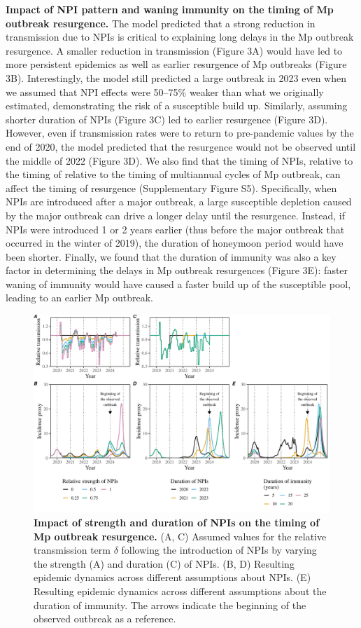 \documentclass[12pt]{article}
\begin{document}
\textbf{Impact of NPI pattern and waning immunity on the timing of Mp outbreak resurgence.}
The model predicted that a strong reduction in transmission due to NPIs is critical to explaining long delays in the Mp outbreak resurgence.
A smaller reduction in transmission (Figure 3A) would have led to more persistent epidemics as well as earlier resurgence of Mp outbreaks (Figure 3B).
Interestingly, the model still predicted a large outbreak in 2023 even when we assumed that NPI effects were 50--75\% weaker than what we originally estimated, demonstrating the risk of a susceptible build up.
Similarly, assuming shorter duration of NPIs (Figure 3C) led to earlier resurgence (Figure 3D).
However, even if transmission rates were to return to pre-pandemic values by the end of 2020, the model predicted that the resurgence would not be observed until the middle of 2022 (Figure 3D).
We also find that the timing of NPIs, relative to the timing of relative to the timing of multiannual cycles of Mp outbreak, can affect the timing of resurgence (Supplementary Figure S5).
Specifically, when NPIs are introduced after a major outbreak, a large susceptible depletion caused by the major outbreak can drive a longer delay until the resurgence.
Instead, if NPIs were introduced 1 or 2 years earlier (thus before the major outbreak that occurred in the winter of 2019), the duration of honeymoon period would have been shorter.
Finally, we found that the duration of immunity was also a key factor in determining the delays in Mp outbreak resurgences (Figure 3E):
faster waning of immunity would have caused a faster build up of the susceptible pool, leading to an earlier Mp outbreak.

\begin{figure}[!th]
\includegraphics[width=\textwidth]{../figure3/figure3_new.pdf}
\caption{
\textbf{Impact of strength and duration of NPIs on the timing of Mp outbreak resurgence.}
(A, C) Assumed values for the relative transmission term $\delta$ following the introduction of NPIs by varying the strength (A) and duration (C) of NPIs.
(B, D) Resulting epidemic dynamics across different assumptions about NPIs.
(E) Resulting epidemic dynamics across different assumptions about the duration of immunity.
The arrows indicate the beginning of the observed outbreak as a reference.
}
\end{figure}
\end{document}
